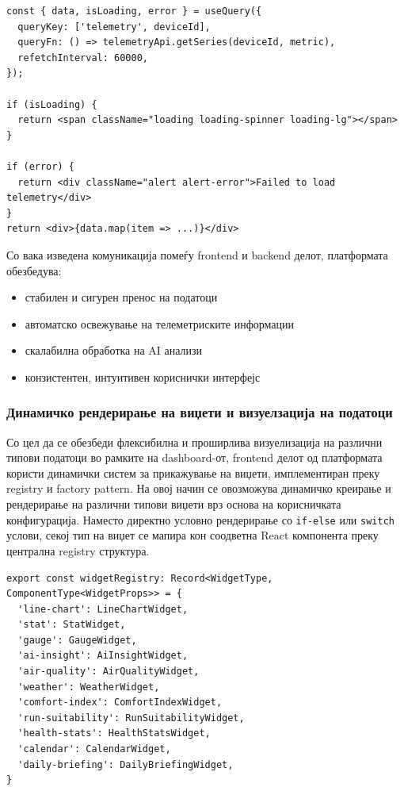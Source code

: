 \begin{verbatim}
const { data, isLoading, error } = useQuery({
  queryKey: ['telemetry', deviceId],
  queryFn: () => telemetryApi.getSeries(deviceId, metric),
  refetchInterval: 60000,
});

if (isLoading) {
  return <span className="loading loading-spinner loading-lg"></span>
}

if (error) {
  return <div className="alert alert-error">Failed to load telemetry</div>
}
return <div>{data.map(item => ...)}</div>
\end{verbatim}

Со вака изведена комуникација помеѓу frontend и backend делот, платформата обезбедува:
\begin{itemize}
    \item стабилен и сигурен пренос на податоци
    \item автоматско освежување на телеметриските информации
    \item скалабилна обработка на AI анализи
    \item конзистентен, интуитивен кориснички интерфејс
\end{itemize}

\subsubsection{Динамичко рендерирање на виџети и визуелзација на податоци}

Со цел да се обезбеди флексибилна и проширлива визуелизација на различни типови податоци во рамките на dashboard-от, frontend делот од платформата користи динамички систем за прикажување на виџети, имплементиран преку registry и factory pattern. На овој начин се овозможува динамичко креирање и рендерирање на различни типови виџети врз основа на корисничката конфигурација. Наместо директно условно рендерирање со \texttt{if-else} или \texttt{switch} услови, секој тип на виџет се мапира кон соодветна React компонента преку централна registry структура.

\begin{verbatim}
export const widgetRegistry: Record<WidgetType, ComponentType<WidgetProps>> = {
  'line-chart': LineChartWidget,
  'stat': StatWidget,
  'gauge': GaugeWidget,
  'ai-insight': AiInsightWidget,
  'air-quality': AirQualityWidget,
  'weather': WeatherWidget,
  'comfort-index': ComfortIndexWidget,
  'run-suitability': RunSuitabilityWidget,
  'health-stats': HealthStatsWidget,
  'calendar': CalendarWidget,
  'daily-briefing': DailyBriefingWidget,
}
\end{verbatim}

